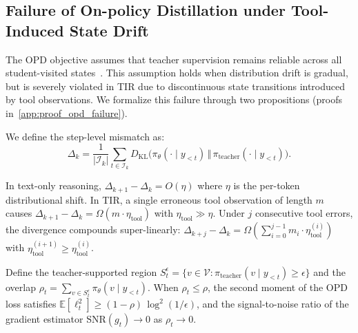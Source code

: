 \subsection{Failure of On-policy Distillation under Tool-Induced State Drift}
\label{sec:failure_uniform_opd}

The OPD objective assumes that teacher supervision remains reliable across all student-visited states~\citep{fu2026revisiting,li2026rethinking,bousselham2025vold}. This assumption holds when distribution drift is gradual, but is severely violated in TIR due to discontinuous state transitions introduced by tool observations. We formalize this failure through two propositions (proofs in~\cref{app:proof_opd_failure}).

We define the step-level mismatch as:
\begin{equation}
    \Delta_k = \frac{1}{|\mathcal{I}_k|} \sum_{t\in \mathcal{I}_k} D_{\mathrm{KL}}\bigl(\pi_\theta(\cdot \mid y_{<t}) \,\big\Vert\, \pi_{\mathrm{teacher}}(\cdot \mid y_{<t})\bigr).
\end{equation}

\begin{proposition}
\label{prop:discontinuous_drift}
In text-only reasoning, $\Delta_{k+1} - \Delta_k = O(\eta)$ where $\eta$ is the per-token distributional shift. In TIR, a single erroneous tool observation of length $m$ causes $\Delta_{k+1} - \Delta_k = \Omega(m \cdot \eta_{\mathrm{tool}})$ with $\eta_{\mathrm{tool}} \gg \eta$. Under $j$ consecutive tool errors, the divergence compounds super-linearly: $\Delta_{k+j} - \Delta_k = \Omega\!\left(\sum_{i=0}^{j-1} m_i \cdot \eta_{\mathrm{tool}}^{(i)}\right)$ with $\eta_{\mathrm{tool}}^{(i+1)} \ge \eta_{\mathrm{tool}}^{(i)}$.
\end{proposition}

\begin{proposition}
\label{prop:variance_explosion}
Define the teacher-supported region $S_t^\epsilon = \{v \in \mathcal{V}: \pi_{\mathrm{teacher}}(v \mid y_{<t}) \ge \epsilon\}$ and the overlap $\rho_t = \sum_{v \in S_t^\epsilon} \pi_\theta(v \mid y_{<t})$. When $\rho_t \le \rho$, the second moment of the OPD loss satisfies $\mathbb{E}[\ell_t^2] \ge (1 - \rho)\,\log^2(1/\epsilon)$, and the signal-to-noise ratio of the gradient estimator $\mathrm{SNR}(g_t) \to 0$ as $\rho_t \to 0$.
\end{proposition}

